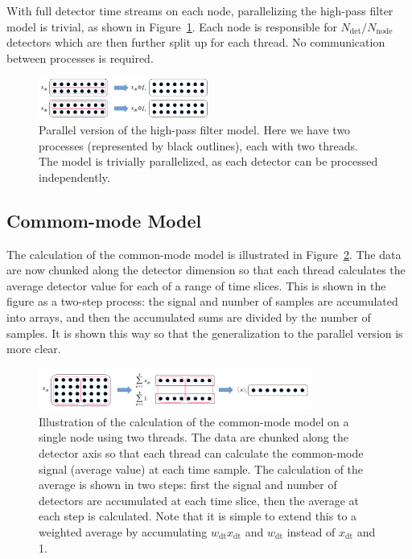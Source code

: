 \documentclass[oneside,11pt]{starlink}
\begin{document}
With full detector time streams on each node, parallelizing the
high-pass filter model is trivial, as shown in
Figure~\ref{fig:parallel_highpass}. Each node is responsible for
$N_\mathrm{det} / N_\mathrm{node}$ detectors which are then further
split up for each thread. No communication between processes is
required.

\begin{figure}[ht]
\begin{center}
\includegraphics[width=0.5\textwidth]{ssn79_parallel_highpass}
\caption[Parallel High-pass Filter Model]{Parallel version of the
  high-pass filter model. Here we have two processes (represented by
  black outlines), each with two threads. The model is trivially
  parallelized, as each detector can be processed independently.}
\label{fig:parallel_highpass}
\end{center}
\end{figure}

\subsection{Commom-mode Model}

The calculation of the common-mode model is illustrated in
Figure~\ref{fig:serial_common}. The data are now chunked along the
detector dimension so that each thread calculates the average detector
value for each of a range of time slices. This is shown in the figure
as a two-step process:  the signal and number of samples are
accumulated into arrays, and then the accumulated sums are divided by
the number of samples. It is shown this way so that the generalization
to the parallel version is more clear.

\begin{figure}[ht]
\begin{center}
\includegraphics[width=0.8\textwidth]{ssn79_serial_common}
\caption[Serial Common-mode Model]{Illustration of the calculation of
  the common-mode model on a single node using two threads. The data
  are chunked along the detector axis so that each thread can
  calculate the common-mode signal (average value) at each time
  sample. The calculation of the average is shown in two steps: first
  the signal and number of detectors are accumulated at each time
  slice, then the average at each step is calculated. Note that it is
  simple to extend this to a weighted average by accumulating
  $w_\mathrm{dt} x_\mathrm{dt}$ and $w_\mathrm{dt}$ instead of
  $x_\mathrm{dt}$ and 1.}
\label{fig:serial_common}
\end{center}
\end{figure}
\end{document}
